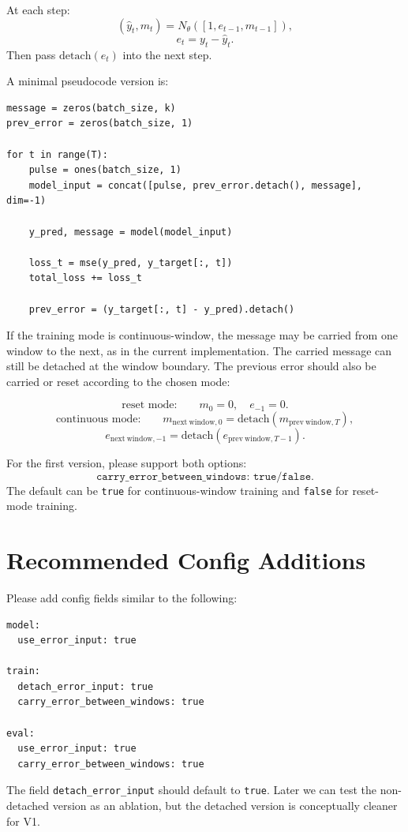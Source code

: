 \documentclass[11pt]{article}
\begin{document}
At each step:
\[
(\hat y_t, m_t) = N_\theta([1, e_{t-1}, m_{t-1}]),
\]
\[
e_t = y_t - \hat y_t.
\]
Then pass $\mathrm{detach}(e_t)$ into the next step.

A minimal pseudocode version is:

\begin{verbatim}
message = zeros(batch_size, k)
prev_error = zeros(batch_size, 1)

for t in range(T):
    pulse = ones(batch_size, 1)
    model_input = concat([pulse, prev_error.detach(), message], dim=-1)

    y_pred, message = model(model_input)

    loss_t = mse(y_pred, y_target[:, t])
    total_loss += loss_t

    prev_error = (y_target[:, t] - y_pred).detach()
\end{verbatim}

If the training mode is continuous-window, the message may be carried from one window to the next, as in the current implementation. The carried message can still be detached at the window boundary. The previous error should also be carried or reset according to the chosen mode:

\[
\text{reset mode:}
\qquad
m_0=0,\quad e_{-1}=0.
\]
\[
\text{continuous mode:}
\qquad
m_{\mathrm{next\ window},0}
=
\mathrm{detach}(m_{\mathrm{prev\ window},T}),
\]
\[
e_{\mathrm{next\ window},-1}
=
\mathrm{detach}(e_{\mathrm{prev\ window},T-1}).
\]

For the first version, please support both options:
\[
\texttt{carry\_error\_between\_windows: true/false}.
\]
The default can be \texttt{true} for continuous-window training and \texttt{false} for reset-mode training.

\section{Recommended Config Additions}

Please add config fields similar to the following:

\begin{verbatim}
model:
  use_error_input: true

train:
  detach_error_input: true
  carry_error_between_windows: true

eval:
  use_error_input: true
  carry_error_between_windows: true
\end{verbatim}

The field \texttt{detach\_error\_input} should default to \texttt{true}. Later we can test the non-detached version as an ablation, but the detached version is conceptually cleaner for V1.
\end{document}
